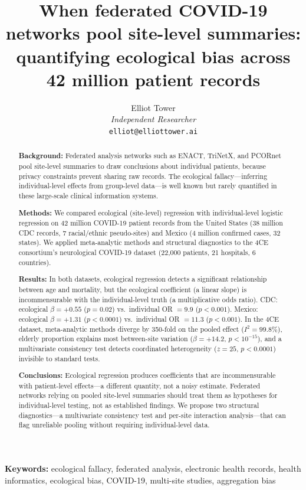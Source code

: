 \documentclass[11pt]{article}
\title{When federated COVID-19 networks pool site-level summaries:\\ quantifying ecological bias across 42 million patient records}
\author{Elliot Tower\\
\textit{Independent Researcher}\\
\texttt{elliot@elliottower.ai}}
\date{}
\begin{document}
\maketitle

\begin{abstract}
\noindent\textbf{Background:}
Federated analysis networks such as ENACT, TriNetX, and PCORnet pool
site-level summaries to draw conclusions about individual patients,
because privacy constraints prevent sharing raw records.
The ecological fallacy---inferring individual-level effects from
group-level data---is well known but rarely quantified in these
large-scale clinical information systems.

\noindent\textbf{Methods:}
We compared ecological (site-level) regression with individual-level
logistic regression on 42 million COVID-19 patient records from the United
States (38 million CDC records, 7 racial/ethnic pseudo-sites) and Mexico
(4 million confirmed cases, 32 states).  We applied meta-analytic methods
and structural diagnostics to the 4CE consortium's neurological COVID-19
dataset (22,000 patients, 21 hospitals, 6 countries).

\noindent\textbf{Results:}
In both datasets, ecological regression detects a significant relationship
between age and mortality, but the ecological coefficient (a linear slope)
is incommensurable with the individual-level truth (a multiplicative odds
ratio).  CDC: ecological $\beta = +0.55$ ($p = 0.02$) vs.\ individual
OR $= 9.9$ ($p < 0.001$).  Mexico: ecological $\beta = +1.31$
($p < 0.0001$) vs.\ individual OR $= 11.3$ ($p < 0.001$).  In the 4CE
dataset, meta-analytic methods diverge by 350-fold on the pooled effect
($I^2 = 99.8\%$), elderly proportion explains most between-site variation
($\beta = +14.2$, $p < 10^{-15}$), and a multivariate consistency test
detects coordinated heterogeneity ($z = 25$, $p < 0.0001$) invisible to
standard tests.

\noindent\textbf{Conclusions:}
Ecological regression produces coefficients that are incommensurable with
patient-level effects---a different quantity, not a noisy estimate.
Federated networks relying on pooled site-level summaries should treat
them as hypotheses for individual-level testing, not as established
findings.  We propose two structural diagnostics---a multivariate
consistency test and per-site interaction analysis---that can flag
unreliable pooling without requiring individual-level data.
\end{abstract}

\noindent\textbf{Keywords:} ecological fallacy, federated analysis,
electronic health records, health informatics, ecological bias,
COVID-19, multi-site studies, aggregation bias
\end{document}
